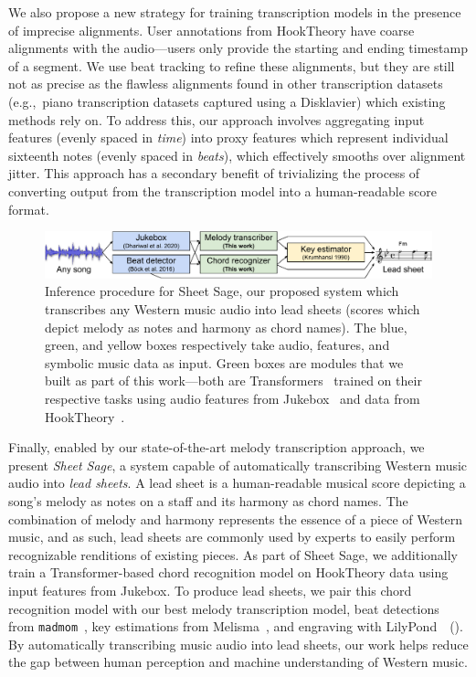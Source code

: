 \documentclass{article}
\newcommand{\madmom}{\texttt{madmom}}
\newcommand{\hooktheory}{HookTheory}
\newcommand{\sheetsage}{Sheet Sage}
\begin{document}
We also propose a new strategy for training transcription models in the presence of imprecise alignments. 
User annotations from \hooktheory{} have coarse alignments with the audio---users only provide the starting and ending timestamp of a segment. 
We use beat tracking to refine these alignments, but they are still not as precise as the flawless alignments found in other transcription datasets (e.g.,~piano transcription datasets captured using a Disklavier) which existing methods rely on. 
To address this, our approach involves aggregating input features (evenly spaced in \emph{time}) into proxy features which represent individual sixteenth notes (evenly spaced in \emph{beats}), 
which effectively smooths over alignment jitter. 
This approach has a secondary benefit of trivializing the process of converting output from the transcription model into a human-readable score format. %

\begin{figure}
    \centering
    \includegraphics[width=\linewidth]{figs/sheet_sage.pdf}
    \caption{
    Inference procedure for Sheet Sage, our proposed system which transcribes any Western music audio into lead sheets (scores which depict melody as notes and harmony as chord names). The blue, green, and yellow boxes respectively take audio, features, and symbolic music data as input. Green boxes are modules that we built as part of this work---both are Transformers~\cite{vaswani2017attention} trained on their respective tasks using audio features from Jukebox~\cite{dhariwal2020jukebox} and data from \hooktheory~\cite{hooktheory}.}
    \label{fig:sheet_sage}
\end{figure}

Finally, enabled by our state-of-the-art melody transcription approach, we present \emph{\sheetsage}, a system capable of automatically transcribing Western music audio into \emph{lead sheets}. 
A lead sheet is a human-readable musical score depicting a song's melody as notes on a staff and its harmony as chord names. 
The combination of melody and harmony represents the essence of a piece of Western music, and as such, lead sheets are commonly used by experts to easily perform recognizable renditions of existing pieces. 
As part of \sheetsage, we additionally train a Transformer-based chord recognition model on \hooktheory{} data using input features from Jukebox. 
To produce lead sheets, we pair this chord recognition model with our best melody transcription model, beat detections from \madmom~\cite{bock2016madmom,bock2016joint}, key estimations from Melisma~\cite{krumhansl1990cognitive,temperley1999key,sleator2001melisma}, and engraving with LilyPond~\cite{nienhuys2003lilypond}~(). 
By automatically transcribing music audio into lead sheets, our work helps reduce the gap between human perception and machine understanding of Western music.
\end{document}
